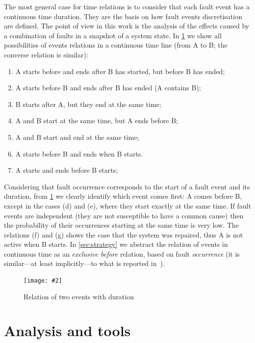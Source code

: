 \documentclass[12pt,openright,twoside,a4paper,oldfontcommands,english,brazil,final]{abntex2}
\theoremstyle{theo}
\newcommand{\includegraphicsaspectratio}[2][1]{%
  \texttt{[image: \#2]}%
}
\begin{document}
The most general case for time relations is to consider that each fault event has a continuous time duration.
They are the basis on how fault events discretisation are defined.
The point of view in this work is the analysis of the effects caused by a combination of faults in a snapshot of a system state.
In \cref{fig:time-relations} we show all possibilities of events relations in a continuous time line (from A to B; the converse relation is similar):

\begin{enumerate}\renewcommand{\theenumi}{\alph{enumi}}
  \item A starts before and ends after B has started, but before B has ended;
  \item A starts before B and ends after B has ended (A contains B);
  \item B starts after A, but they end at the same time;
  \item A and B start at the same time, but A ends before B;
  \item A and B start and end at the same time;
  \item A starts before B and ends when B starts.
  \item A starts and ends before B starts;
\end{enumerate}

Considering that fault occurrence corresponds to the start of a fault event and its duration, from \cref{fig:time-relations} we clearly identify which event comes first: A comes before B, except in the cases (d) and (e), where they start exactly at the same time.
If fault events are independent (they are not susceptible to have a common cause) then the probability of their occurrences starting at the same time is very low.
The relations (f) and (g) shows the case that the system was repaired, thus A is not active when B starts.
In \cref{sec:strategy} we abstract the relation of events in continuous time as an \emph{exclusive before} relation, based on fault \emph{occurrence} (it is similar---at least implicitly---to what is reported in~\cite{WP2009,MRL2011}).

\begin{figure}[htb]
  \centering
  \includegraphicsaspectratio[0.5]{time-relations}
  \caption{Relation of two events with duration}
  \label{fig:time-relations}
\end{figure}

\chapter{Analysis and tools}
\label{chap:analysis}
\end{document}
